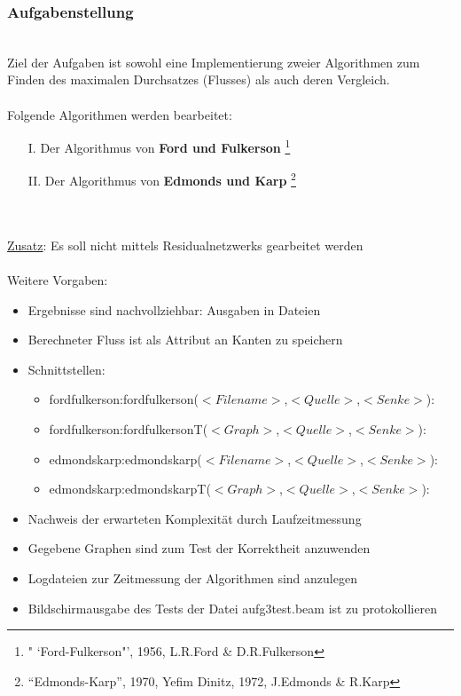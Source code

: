 \documentclass[11pt]{article}
\begin{document}
    \subsubsection{Aufgabenstellung}\\
    Ziel der Aufgaben ist sowohl eine Implementierung zweier Algorithmen zum Finden des maximalen Durchsatzes (Flusses) als auch deren Vergleich.\\~\\
    Folgende Algorithmen werden bearbeitet:
    \begin{itemize}
        \item[I.] Der Algorithmus von \textbf{Ford und Fulkerson} \footnote[1]{" `Ford-Fulkerson"', 1956, L.R.Ford \& D.R.Fulkerson}
        \item[II.] Der Algorithmus von \textbf{Edmonds und Karp} \footnote[2]{"`Edmonds-Karp"', 1970, Yefim Dinitz, 1972, J.Edmonds \& R.Karp}
    \end{itemize}\\~\\
    \underline{Zusatz}: Es soll nicht mittels Residualnetzwerks gearbeitet werden\\~\\
    Weitere Vorgaben:
    \begin{itemize}
        \item Ergebnisse sind nachvollziehbar: Ausgaben in Dateien
        \item Berechneter Fluss ist als Attribut an Kanten zu speichern
        \newpage
        \item Schnittstellen:
        \begin{itemize}
            \item fordfulkerson:fordfulkerson($<Filename>$,$<Quelle>$,$<Senke>$):\\ 
            \item fordfulkerson:fordfulkersonT($<Graph>$,$<Quelle>$,$<Senke>$):\\ 
            \item edmondskarp:edmondskarp($<Filename>$,$<Quelle>$,$<Senke>$):\\ 
            \item edmondskarp:edmondskarpT($<Graph>$,$<Quelle>$,$<Senke>$):\\ 
        \end{itemize}
        \item Nachweis der erwarteten Komplexit\"at durch Laufzeitmessung
        \item Gegebene Graphen sind zum Test der Korrektheit anzuwenden
        \item Logdateien zur Zeitmessung der Algorithmen sind anzulegen
        \item Bildschirmausgabe des Tests der Datei aufg3test.beam ist zu protokollieren
    \end{itemize}
\end{document}
